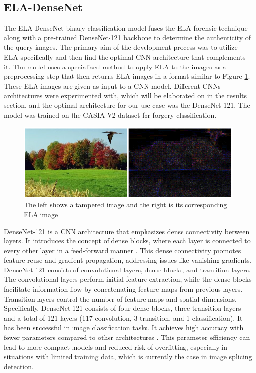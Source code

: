 \subsection{ELA-DenseNet} \label{sec:ss1}

The ELA-DenseNet binary classification model fuses the ELA forensic technique along with a pre-trained DenseNet-121 backbone to determine the authenticity of the query images. The primary aim of the development process was to utilize ELA specifically and then find the optimal CNN architecture that complements it. The model uses a specialized method to apply ELA to the images as a preprocessing step that then returns ELA images in a format similar to Figure \ref{fig:ELA}. These ELA images are given as input to a CNN model. Different CNNs architectures were experimented with, which will be elaborated on in the results section, and the optimal architecture for our use-case was the DenseNet-121. The model was trained on the CASIA V2 dataset for forgery classification. 

\begin{figure}[!h]
    \centering
    \includegraphics[width=0.8\linewidth]{figures/ELA.png}
    \caption{The left shows a tampered image and the right is its corresponding ELA image}
    \label{fig:ELA}
\end{figure}

DenseNet-121 is a CNN architecture that emphasizes dense connectivity between layers. It introduces the concept of dense blocks, where each layer is connected to every other layer in a feed-forward manner \cite{DenseNet}. This dense connectivity promotes feature reuse and gradient propagation, addressing issues like vanishing gradients. DenseNet-121 consists of convolutional layers, dense blocks, and transition layers. The convolutional layers perform initial feature extraction, while the dense blocks facilitate information flow by concatenating feature maps from previous layers. Transition layers control the number of feature maps and spatial dimensions. Specifically, DenseNet-121 consists of four dense blocks, three transition layers and a total of 121 layers (117-convolution, 3-transition, and 1-classification). It has been successful in image classification tasks. It achieves high accuracy with fewer parameters compared to other architectures \cite{DenseNet}. This parameter efficiency can lead to more compact models and reduced risk of overfitting, especially in situations with limited training data, which is currently the case in image splicing detection.

